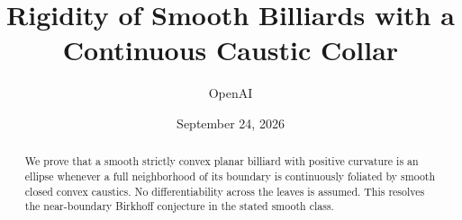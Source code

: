 \documentclass[11pt]{article}
\title{Rigidity of Smooth Billiards with a Continuous Caustic Collar}
\author{OpenAI}
\date{September 24, 2026}
\numberwithin{equation}{section}
\theoremstyle{definition}
\begin{document}
\maketitle
\begin{abstract}
We prove that a smooth strictly convex planar billiard with positive
curvature is an ellipse whenever a full neighborhood of its boundary is
continuously foliated by smooth closed convex caustics. No differentiability
across the leaves is assumed. This resolves the near-boundary Birkhoff
conjecture in the stated smooth class.
\end{abstract}
\tableofcontents
\clearpage











{}


\end{document}
